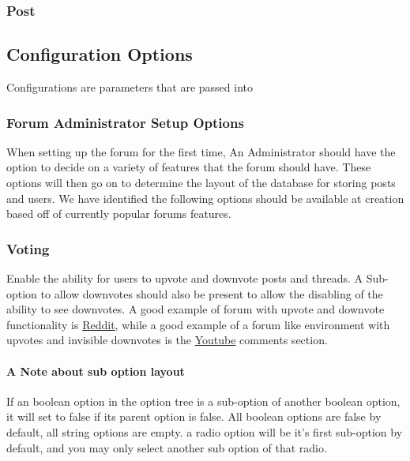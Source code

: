 \documentclass[]{article}
\begin{document}
\subsubsection{Post}\label{post}

\subsection{Configuration Options}
Configurations are parameters that are passed into  

\subsubsection{Forum Administrator Setup Options}
When setting up the forum for the first time, An Administrator should have the option to decide on a variety of features that the forum should have. These options will then go on to determine the layout of the database for storing posts and users. We have identified the following options should be available at creation based off of currently popular forums features.

\subsubsection{Voting}
Enable the ability for users to upvote and downvote posts and threads. A Sub-option to allow downvotes should also be present to allow the disabling of the ability to see downvotes. 
A good example of forum with upvote and downvote functionality is \href{https://www.reddit.com/}{Reddit}, while a good example of a forum like environment with upvotes and invisible downvotes is the \href{https://www.youtube.com/}{Youtube} comments section. 

\paragraph{A Note about sub option layout}
If an boolean option in the option tree is a sub-option of another boolean option, it will set to false if its parent option is false. All boolean options are false by default, all string options are empty. a radio option will be it's first sub-option by default, and you may only select another sub option of that radio.
\\
\end{document}
